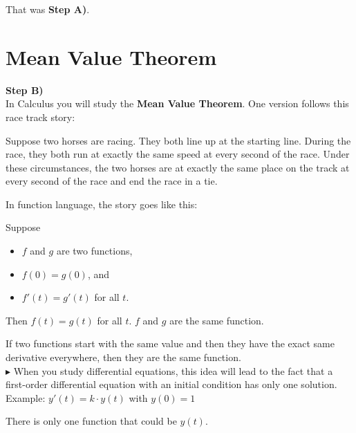\documentclass{ximera}
\begin{document}
That was \textbf{\textcolor{purple!85!blue}{Step A)}}. \\





\section{Mean Value Theorem}

\textbf{\textcolor{purple!85!blue}{Step B)}} \\

In Calculus you will study the \textbf{Mean Value Theorem}. One version follows this race track story:


Suppose two horses are racing.  They both line up at the starting line.  During the race, they both run at exactly the same speed at every second of the race.  Under these circumstances, the two horses are at exactly the same place on the track at every second of the race and end the race in a tie.




In function language, the story goes like this:

Suppose 

\begin{itemize}
\item $f$ and $g$ are two functions,
\item $f(0) = g(0)$, and
\item $f'(t) = g'(t)$  for all $t$.
\end{itemize}

Then $f(t)=g(t)$ for all $t$.   $f$ and $g$ are the same function.



If two functions start with the same value and then they have the exact same derivative everywhere, then they are the same function. \\









$\blacktriangleright$  When you study differential equations, this idea will lead to the fact that a first-order differential equation with an initial condition has only one solution. \\

Example: $y'(t) = k \cdot y(t)$ with $y(0)=1$


There is only one function that could be $y(t)$.
\end{document}
